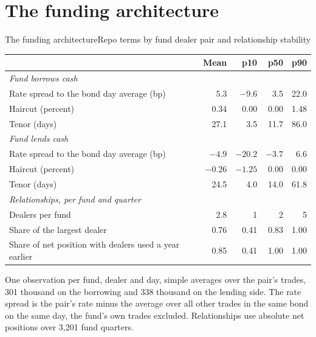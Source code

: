 \documentclass[aspectratio=169,11pt]{beamer}
\begin{document}
\section{The funding architecture}
\begin{frame}{The funding architecture}{Repo terms by fund dealer pair and relationship stability}
  \vspace{-0.6em}
  \begin{center}\scriptsize
  \begin{tabular}{lrrrr}
    \toprule
    & Mean & p10 & p50 & p90 \\
    \midrule
    \multicolumn{5}{l}{\textit{Fund borrows cash}} \\
    Rate spread to the bond day average (bp) & 5.3 & $-9.6$ & 3.5 & 22.0 \\
    Haircut (percent) & 0.34 & 0.00 & 0.00 & 1.48 \\
    Tenor (days) & 27.1 & 3.5 & 11.7 & 86.0 \\
    \midrule
    \multicolumn{5}{l}{\textit{Fund lends cash}} \\
    Rate spread to the bond day average (bp) & $-4.9$ & $-20.2$ & $-3.7$ & 6.6 \\
    Haircut (percent) & $-0.26$ & $-1.25$ & 0.00 & 0.00 \\
    Tenor (days) & 24.5 & 4.0 & 14.0 & 61.8 \\
    \midrule
    \multicolumn{5}{l}{\textit{Relationships, per fund and quarter}} \\
    Dealers per fund & 2.8 & 1 & 2 & 5 \\
    Share of the largest dealer & 0.76 & 0.41 & 0.83 & 1.00 \\
    Share of net position with dealers used a year earlier & 0.85 & 0.41 & 1.00 & 1.00 \\
    \bottomrule
  \end{tabular}
  \end{center}
  {\tiny\color{slate} One observation per fund, dealer and day, simple averages over the pair's trades, 301 thousand on the borrowing and 338 thousand on the lending side. The rate spread is the pair's rate minus the average over all other trades in the same bond on the same day, the fund's own trades excluded. Relationships use absolute net positions over 3,201 fund quarters.\par}
\end{frame}


\end{document}
